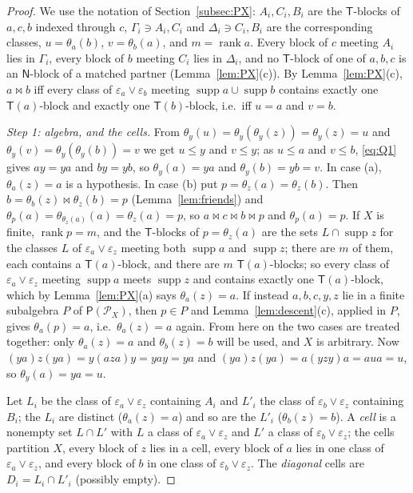 \documentclass[11pt]{amsart}
\theoremstyle{definition}
\renewcommand{\P}{\mathcal{P}}      %
\newcommand{\PA}{\mathsf{P}}         %
\newcommand{\supp}{\operatorname{supp}}
\newcommand{\T}{\mathsf{T}}
\newcommand{\N}{\mathsf{N}}
\newcommand{\rk}{\operatorname{rank}}
\newcommand{\mt}{\bowtie}      %
\begin{document}
\begin{proof}
We use the notation of Section~\ref{subsec:PX}: $A_i,C_i,B_i$ are the $\T$-blocks of $a,c,b$ indexed through $c$, $\Gamma_i\ni A_i,C_i$ and $\Delta_i\ni C_i,B_i$ are the corresponding classes, $u=\theta_a(b)$, $v=\theta_b(a)$, and $m=\rk a$. Every block of $c$ meeting $A_i$ lies in $\Gamma_i$, every block of $b$ meeting $C_i$ lies in $\Delta_i$, and no $\T$-block of one of $a,b,c$ is an $\N$-block of a matched partner (Lemma~\ref{lem:PX}(c)). By Lemma~\ref{lem:PX}(c), $a\mt b$ iff every class of $\varepsilon_a\vee\varepsilon_b$ meeting $\supp a\cup\supp b$ contains exactly one $\T(a)$-block and exactly one $\T(b)$-block, i.e.\ iff $u=a$ and $v=b$.

\smallskip\emph{Step 1: algebra, and the cells.} From $\theta_y(u)=\theta_y(\theta_y(z))=\theta_y(z)=u$ and $\theta_y(v)=\theta_y(\theta_y(b))=v$ we get $u\le y$ and $v\le y$; as $u\le a$ and $v\le b$, \eqref{eq:Q1} gives $ay=ya$ and $by=yb$, so $\theta_y(a)=ya$ and $\theta_y(b)=yb=v$. In case (a), $\theta_a(z)=a$ is a hypothesis. In case (b) put $p=\theta_z(a)=\theta_z(b)$. Then $b=\theta_b(z)\mt\theta_z(b)=p$ (Lemma~\ref{lem:friends}) and $\theta_p(a)=\theta_{\theta_z(a)}(a)=\theta_z(a)=p$, so $a\mt c\mt b\mt p$ and $\theta_p(a)=p$. If $X$ is finite, $\rk p=m$, and the $\T$-blocks of $p=\theta_z(a)$ are the sets $L\cap\supp z$ for the classes $L$ of $\varepsilon_a\vee\varepsilon_z$ meeting both $\supp a$ and $\supp z$; there are $m$ of them, each contains a $\T(a)$-block, and there are $m$ $\T(a)$-blocks; so every class of $\varepsilon_a\vee\varepsilon_z$ meeting $\supp a$ meets $\supp z$ and contains exactly one $\T(a)$-block, which by Lemma~\ref{lem:PX}(a) says $\theta_a(z)=a$. If instead $a,b,c,y,z$ lie in a finite subalgebra $P$ of $\PA(\P_X)$, then $p\in P$ and Lemma~\ref{lem:descent}(c), applied in $P$, gives $\theta_a(p)=a$, i.e.\ $\theta_a(z)=a$ again. From here on the two cases are treated together: only $\theta_a(z)=a$ and $\theta_b(z)=b$ will be used, and $X$ is arbitrary. Now $(ya)z(ya)=y(aza)y=yay=ya$ and $(ya)z(ya)=a(yzy)a=aua=u$, so $\theta_y(a)=ya=u$.

Let $L_i$ be the class of $\varepsilon_a\vee\varepsilon_z$ containing $A_i$ and $L'_i$ the class of $\varepsilon_b\vee\varepsilon_z$ containing $B_i$; the $L_i$ are distinct ($\theta_a(z)=a$) and so are the $L'_i$ ($\theta_b(z)=b$). A \emph{cell} is a nonempty set $L\cap L'$ with $L$ a class of $\varepsilon_a\vee\varepsilon_z$ and $L'$ a class of $\varepsilon_b\vee\varepsilon_z$; the cells partition $X$, every block of $z$ lies in a cell, every block of $a$ lies in one class of $\varepsilon_a\vee\varepsilon_z$, and every block of $b$ in one class of $\varepsilon_b\vee\varepsilon_z$. The \emph{diagonal} cells are $D_i=L_i\cap L'_i$ (possibly empty).


\end{proof}
\end{document}

